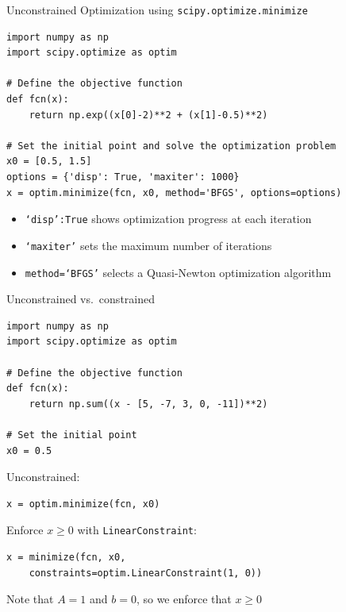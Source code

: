 \documentclass{beamer}
\begin{document}
\begin{frame}[fragile]{Unconstrained Optimization using \texttt{scipy.optimize.minimize}}

        \begin{lstlisting}[style=python]
import numpy as np
import scipy.optimize as optim

# Define the objective function
def fcn(x):
    return np.exp((x[0]-2)**2 + (x[1]-0.5)**2)

# Set the initial point and solve the optimization problem
x0 = [0.5, 1.5]
options = {'disp': True, 'maxiter': 1000}
x = optim.minimize(fcn, x0, method='BFGS', options=options)
        \end{lstlisting}
 
    \begin{itemize}
        \item \texttt{`disp':True} shows optimization progress at each iteration
        \item \texttt{`maxiter'} sets the maximum number of iterations
        \item \texttt{method=`BFGS'} selects a Quasi-Newton optimization algorithm
    \end{itemize}

\end{frame}


\begin{frame}[fragile]{Unconstrained vs.\ constrained}

        \begin{lstlisting}[style=python]
import numpy as np
import scipy.optimize as optim

# Define the objective function
def fcn(x):
    return np.sum((x - [5, -7, 3, 0, -11])**2)

# Set the initial point
x0 = 0.5
        \end{lstlisting}
 
Unconstrained:
        \begin{lstlisting}[style=python]
x = optim.minimize(fcn, x0)
        \end{lstlisting}
 
Enforce $x \geq 0$ with \texttt{LinearConstraint}:
        \begin{lstlisting}[style=python]
x = minimize(fcn, x0, 
    constraints=optim.LinearConstraint(1, 0))
        \end{lstlisting}
Note that $A = 1$ and $b=0$, so we enforce that $x \geq 0$ 

\end{frame}
\end{document}

